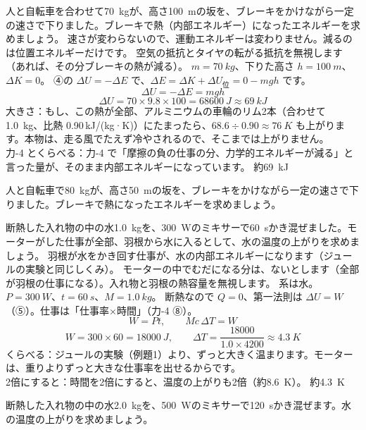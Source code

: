 \label{ph:熱-2:ex7}
\begin{phreidai}
人と自転車を合わせて\qty{70}{kg}が、高さ\qty{100}{m}の坂を、ブレーキをかけながら一定の速さで下りました。ブレーキで熱（内部エネルギー）になったエネルギーを求めましょう。
\phbamen
速さが変わらないので、運動エネルギーは変わりません。減るのは位置エネルギーだけです。
\phmushi
空気の抵抗とタイヤの転がる抵抗を無視します（あれば、その分ブレーキの熱が減る）。
\phzu
$m=\qty{70}{kg}$、下りた高さ $h=\qty{100}{m}$、$\Delta K=0$。
\phriyu
④の $\Delta U=-\Delta E$ で、$\Delta E=\Delta K+\Delta U_{\text{位}}=0-mgh$ です。
\phtateru
\[\Delta U=-\Delta E=mgh\]
\phtoku
\[\Delta U=70\times9.8\times100=\qty{68600}{J}\approx\qty{69}{kJ}\]
\phtashikame
大きさ：もし、この熱が全部、アルミニウムの車輪のリム2本（合わせて\qty{1.0}{kg}、比熱 0.90\,kJ/(kg·K)）にたまったら、$68.6\div0.90\approx\qty{76}{K}$ も上がります。本物は、走る風でたえず冷やされるので、そこまでは上がりません。\\
力-4 とくらべる：力-4 で「摩擦の負の仕事の分、力学的エネルギーが減る」と言った量が、そのまま内部エネルギーになっています。
\kotae 約\qty{69}{kJ}
\end{phreidai}
\begin{jibun}
人と自転車で\qty{80}{kg}が、高さ\qty{50}{m}の坂を、ブレーキをかけながら一定の速さで下りました。ブレーキで熱になったエネルギーを求めましょう。
\end{jibun}

\label{ph:熱-2:ex8}
\begin{phreidai}
断熱した入れ物の中の水\qty{1.0}{kg}を、\qty{300}{W}のミキサーで\qty{60}{s}かき混ぜました。モーターがした仕事が全部、羽根から水に入るとして、水の温度の上がりを求めましょう。
\phbamen
羽根が水をかき回す仕事が、水の内部エネルギーになります（ジュールの実験と同じしくみ）。
\phmushi
モーターの中でむだになる分は、ないとします（全部が羽根の仕事になる）。入れ物と羽根の熱容量を無視します。
\phzu
系は水。$P=\qty{300}{W}$、$t=\qty{60}{s}$、$M=\qty{1.0}{kg}$。
\phriyu
断熱なので $Q=0$、第一法則は $\Delta U=W$（⑤）。仕事は「仕事率×時間」（力-4 ⑧）。
\phtateru
\[W=Pt,\qquad Mc\,\Delta T=W\]
\phtoku
\[W=300\times60=\qty{18000}{J},\qquad \Delta T=\frac{18000}{1.0\times4200}\approx\qty{4.3}{K}\]
\phtashikame
くらべる：ジュールの実験（例題1）より、ずっと大きく温まります。モーターは、重りよりずっと大きな仕事率を出せるからです。\\
2倍にすると：時間を2倍にすると、温度の上がりも2倍（約\qty{8.6}{K}）。
\kotae 約\qty{4.3}{K}
\end{phreidai}
\begin{jibun}
断熱した入れ物の中の水\qty{2.0}{kg}を、\qty{500}{W}のミキサーで\qty{120}{s}かき混ぜます。水の温度の上がりを求めましょう。
\end{jibun}

